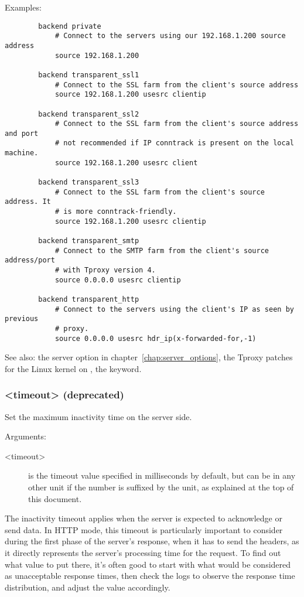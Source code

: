   Examples:
  \begin{verbatim}
        backend private
            # Connect to the servers using our 192.168.1.200 source address
            source 192.168.1.200

        backend transparent_ssl1
            # Connect to the SSL farm from the client's source address
            source 192.168.1.200 usesrc clientip

        backend transparent_ssl2
            # Connect to the SSL farm from the client's source address and port
            # not recommended if IP conntrack is present on the local machine.
            source 192.168.1.200 usesrc client

        backend transparent_ssl3
            # Connect to the SSL farm from the client's source address. It
            # is more conntrack-friendly.
            source 192.168.1.200 usesrc clientip

        backend transparent_smtp
            # Connect to the SMTP farm from the client's source address/port
            # with Tproxy version 4.
            source 0.0.0.0 usesrc clientip

        backend transparent_http
            # Connect to the servers using the client's IP as seen by previous
            # proxy.
            source 0.0.0.0 usesrc hdr_ip(x-forwarded-for,-1)
  \end{verbatim}


See also: the  server option in chapter~\ref{chap:server_options}, the Tproxy patches for
             the Linux kernel on , the  keyword.

\subsubsection[srvtimeout]{ <timeout> (deprecated)}

  Set the maximum inactivity time on the server side.


  Arguments:
  \begin{description}
  \item[<timeout>] is the timeout value specified in milliseconds by default, but
              can be in any other unit if the number is suffixed by the unit,
              as explained at the top of this document.
  \end{description}

  The inactivity timeout applies when the server is expected to acknowledge or
  send data. In HTTP mode, this timeout is particularly important to consider
  during the first phase of the server's response, when it has to send the
  headers, as it directly represents the server's processing time for the
  request. To find out what value to put there, it's often good to start with
  what would be considered as unacceptable response times, then check the logs
  to observe the response time distribution, and adjust the value accordingly.

